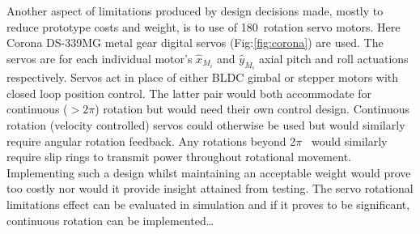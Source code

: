 \par
Another aspect of limitations produced by design decisions made, mostly to reduce prototype costs and weight, is to use of 180\textdegree ~rotation servo motors. Here Corona DS-339MG metal gear digital servos (Fig:\ref{fig:corona}) are used. The servos are for each individual motor's $\hat{x}_{M_i}$ and $\hat{y}_{M_i}$ axial pitch and roll actuations respectively. Servos act in place of either BLDC gimbal or stepper motors with closed loop position control. The latter pair would both accommodate for continuous  ($>2\pi$) rotation but would need their own control design. Continuous rotation (velocity controlled) servos could otherwise be used but would similarly require angular rotation feedback. Any rotations beyond 2$\pi$ ~would similarly require slip rings to transmit power throughout rotational movement. Implementing such a design whilst maintaining an acceptable weight would prove too costly nor would it provide insight attained from testing. The servo rotational limitations effect can be evaluated in simulation and if it proves to be significant, continuous rotation can be implemented\ldots
